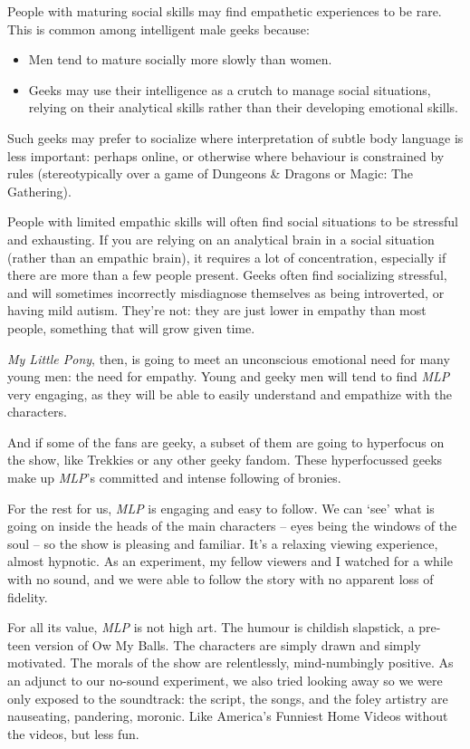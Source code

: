 People with maturing social skills may find empathetic experiences to be rare. This is common among intelligent male geeks because:

\begin{itemize}
  \item Men tend to mature socially more slowly than women.
  \item Geeks may use their intelligence as a crutch to manage social situations, relying on their analytical skills rather than their developing emotional skills.
\end{itemize}

Such geeks may prefer to socialize where interpretation of subtle body language is less important: perhaps online, or otherwise where behaviour is constrained by rules (stereotypically over a game of Dungeons \& Dragons or Magic: The Gathering).

People with limited empathic skills will often find social situations to be stressful and exhausting. If you are relying on an analytical brain in a social situation (rather than an empathic brain), it requires a lot of concentration, especially if there are more than a few people present. Geeks often find socializing stressful, and will sometimes incorrectly misdiagnose themselves as being introverted, or having mild autism. They're not: they are just lower in empathy than most people, something that will grow given time.

\secdiv

\textit{\textit{My Little Pony}}, then, is going to meet an unconscious emotional need for many young men: the need for empathy. Young and geeky men will tend to find \textit{MLP} very engaging, as they will be able to easily understand and empathize with the characters.

And if some of the fans are geeky, a subset of them are going to hyperfocus on the show, like Trekkies or any other geeky fandom. These hyperfocussed geeks make up \textit{MLP}'s committed and intense following of bronies.

For the rest for us, \textit{MLP} is engaging and easy to follow. We can `see' what is going on inside the heads of the main characters -- eyes being the windows of the soul -- so the show is pleasing and familiar. It's a relaxing viewing experience, almost hypnotic. As an experiment, my fellow viewers and I watched for a while with no sound, and we were able to follow the story with no apparent loss of fidelity.

For all its value, \textit{MLP} is not high art. The humour is childish slapstick, a pre-teen version of Ow My Balls. The characters are simply drawn and simply motivated. The morals of the show are relentlessly, mind-numbingly positive. As an adjunct to our no-sound experiment, we also tried looking away so we were only exposed to the soundtrack: the script, the songs, and the foley artistry are nauseating, pandering, moronic. Like America's Funniest Home Videos without the videos, but less fun.

